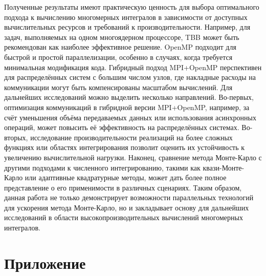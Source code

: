 \documentclass[12pt,a4paper]{extarticle}
\begin{document}
Полученные результаты имеют практическую ценность для выбора оптимального подхода к вычислению многомерных интегралов в зависимости от доступных вычислительных ресурсов и требований к производительности. Например, для задач, выполняемых на одном многоядерном процессоре, TBB может быть рекомендован как наиболее эффективное решение. OpenMP подходит для быстрой и простой параллелизации, особенно в случаях, когда требуется минимальная модификация кода. Гибридный подход MPI+OpenMP перспективен для распределённых систем с большим числом узлов, где накладные расходы на коммуникации могут быть компенсированы масштабом вычислений.
Для дальнейших исследований можно выделить несколько направлений. Во-первых, оптимизация коммуникаций в гибридной версии MPI+OpenMP, например, за счёт уменьшения объёма передаваемых данных или использования асинхронных операций, может повысить её эффективность на распределённых системах. Во-вторых, исследование производительности реализаций на более сложных функциях или областях интегрирования позволит оценить их устойчивость к увеличению вычислительной нагрузки. Наконец, сравнение метода Монте-Карло с другими подходами к численного интегрированию, такими как квази-Монте-Карло или адаптивные квадратурные методы, может дать более полное представление о его применимости в различных сценариях.
Таким образом, данная работа не только демонстрирует возможности параллельных технологий для ускорения метода Монте-Карло, но и закладывает основу для дальнейших исследований в области высокопроизводительных вычислений многомерных интегралов.
\newpage
\section{Приложение}
\end{document}
